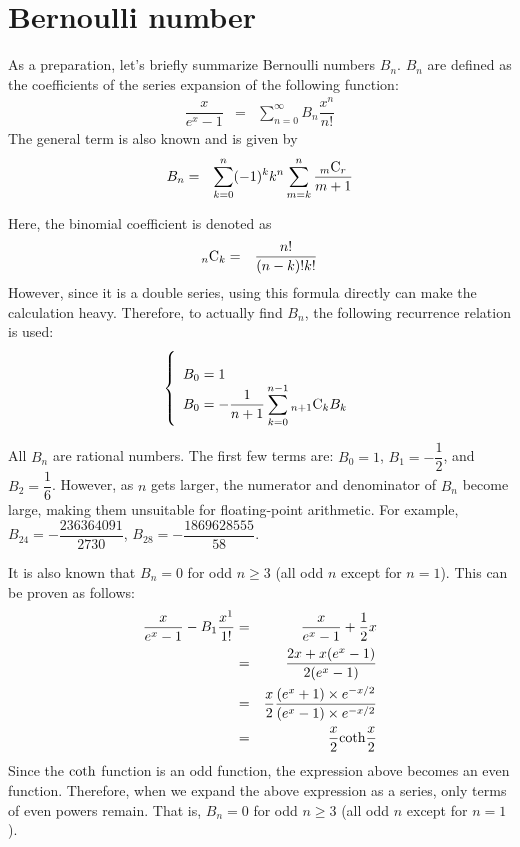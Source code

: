 \documentclass[uplatex,a4j,12pt,dvipdfmx]{jsarticle}
\begin{document}
\section{Bernoulli number}

As a preparation, let's briefly summarize Bernoulli numbers $B_{n}$.
$B_{n}$ are defined as the coefficients of the series expansion of the following function:
\begin{eqnarray}
	\dfrac{x}{e^{x}-1}
	&=&
	\sum_{n=0}^{\infty}
	B_{n}
	\dfrac{x^{n}}{n!}
\end{eqnarray}
The general term is also known and is given by
\begin{eqnarray}
	B_{n}
	&=&
	\sum_{k=0}^{n}
	(-1)^{k}
	k^{n}
	\sum_{m=k}^{n}
	\dfrac{{_{m}}{\rm C}_{r}}{m+1}
\end{eqnarray}




Here, the binomial coefficient is denoted as
\begin{eqnarray}
	{_{n}}{\rm C}_{k}
	&=&
	\dfrac{n!}{(n-k)!k!}
\end{eqnarray}
However, since it is a double series, using this formula directly can make the calculation heavy.
Therefore, to actually find $B_{n}$, the following recurrence relation is used:
\begin{eqnarray}
	\left\{
	\begin{array}{l}
		\\
		B_{0} = 1 \\
		B_{0} = -\dfrac{1}{n+1} \displaystyle \sum_{k=0}^{n-1} {_{n+1}}{\rm C}_{k} B_{k}
	\end{array}
	\right.
\end{eqnarray}

All $B_{n}$ are rational numbers. The first few terms are:
$B_{0}=1$, $B_{1}=-\dfrac{1}{2}$, and $B_{2}=\dfrac{1}{6}$.
However, as $n$ gets larger, the numerator and denominator of $B_{n}$ become large, making them unsuitable for floating-point arithmetic.
For example,
$B_{24}=-\dfrac{236364091}{2730}$,
$B_{28}=-\dfrac{1869628555}{58}$.

It is also known that $B_{n}=0$ for odd $n \geq 3$ (all odd $n$ except for $n=1$).
This can be proven as follows:
\begin{eqnarray}
	\dfrac{x}{e^{x}-1}
	-
	B_{1}
	\dfrac{x^{1}}{1!}
	&=&
	\dfrac{x}{e^{x}-1}
	+
	\dfrac{1}{2}x
	\nonumber \\ &=&
	\dfrac{2x + x(e^{x} -1)}{2(e^{x}-1)}
	\nonumber \\ &=&
	\dfrac{x}{2}
	\dfrac{(e^{x} +1) \times e^{-x/2}}{(e^{x}-1)\times e^{-x/2}}
	\nonumber \\ &=&
	\dfrac{x}{2}
	{\rm coth}\dfrac{x}{2}
\end{eqnarray}
Since the ${\rm coth}$ function is an odd function, the expression above becomes an even function.
Therefore, when we expand the above expression as a series, only terms of even powers remain.
That is,
$B_{n}=0$ for odd $n \geq 3$ (all odd $n$ except for $n=1$).
\end{document}
